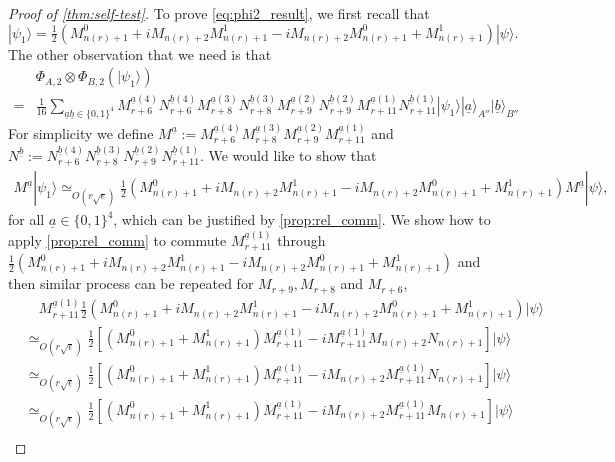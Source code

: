 \documentclass[11pt,letterpaper]{article}
\newcommand{\ket}[1]{|#1\rangle}
\newcommand{\x}{\otimes}
\newcommand{\1}{\mathbb{1}}
\newcommand{\nr}{n(r)}
\newcommand{\ua}{\underline{a}}
\newcommand{\ub}{\underline{b}}
\newcommand{\se}{\sqrt{\epsilon}}
\newcommand{\appd}[1]{\simeq_{#1}}
\theoremstyle{definition}
\begin{document}
\begin{proof}[Proof of \cref{thm:self-test}]
To prove \cref{eq:phi2_result}, we first
recall that 
$\ket{\psi_1} 
	=\frac{1}{2} (M_{\nr+1}^0 + iM_{\nr+2}M_{\nr+1}^1 - iM_{\nr+2}M_{\nr+1}^0 + M_{\nr+1}^1) \ket{\psi}.
$
The other observation that we need is that 
\begin{align}
	&\Phi_{A,2} \x \Phi_{B,2} (\ket{\psi_1})  \\
	= &\frac{1}{16} \sum_{\ua \ub \in\{0,1\}^4}
	M_{r+6}^{\ua(4)}N_{r+6}^{\ub(4)}M_{r+8}^{\ua(3)}N_{r+8}^{\ub(3)}M_{r+9}^{\ua(2)}N_{r+9}^{\ub(2)}M_{r+11}^{\ua(1)}N_{r+11}^{\ub(1)}
	\ket{\psi_1} \ket{\ua}_{A''} \ket{\ub}_{B''}
\end{align}
For simplicity we define $M^{\ua} := M_{r+6}^{\ua(4)}M_{r+8}^{\ua(3)}M_{r+9}^{\ua(2)}M_{r+11}^{\ua(1)}$ and
$N^{\ub} := N_{r+6}^{\ub(4)}N_{r+8}^{\ub(3)}N_{r+9}^{\ub(2)}N_{r+11}^{\ub(1)} $.
We would like to show that 
\begin{align}
\label{eq:mua_comm}
M^{\ua} \ket{\psi_1} \appd{O(r\se)} \frac{1}{2} (M_{\nr+1}^0 + iM_{\nr+2}M_{\nr+1}^1 - iM_{\nr+2}M_{\nr+1}^0 + M_{\nr+1}^1)
M^{\ua} \ket{\psi},
\end{align}
for all $\ua \in \{0,1\}^4$,
which can be justified by \cref{prop:rel_comm}.
We show how to apply \cref{prop:rel_comm} to commute $M_{r+11}^{\ua(1)}$ through 
$\frac{1}{2} (M_{\nr+1}^0 + iM_{\nr+2}M_{\nr+1}^1 - iM_{\nr+2}M_{\nr+1}^0 + M_{\nr+1}^1)$ and then similar process can be repeated for $M_{r+9}, M_{r+8}$ and $M_{r+6}$,
\begin{align*}
	&\quad M_{r+11}^{\ua(1)} \frac{1}{2} (M_{\nr+1}^0 + iM_{\nr+2}M_{\nr+1}^1 - iM_{\nr+2}M_{\nr+1}^0 + M_{\nr+1}^1) \ket{\psi} \\
	&\appd{O(r\se)} \frac{1}{2}[ (M_{\nr+1}^0+M_{\nr+1}^1) M_{r+11}^{\ua(1)} -i M_{r+11}^{\ua(1)} M_{\nr+2}N_{\nr+1}] \ket{\psi} \\
	&\appd{O(r\se)} \frac{1}{2} [(M_{\nr+1}^0+M_{\nr+1}^1) M_{r+11}^{\ua(1)} - iM_{\nr+2}M_{r+11}^{\ua(1)} N_{\nr+1}] \ket{\psi} \\
	&\appd{O(r\se)}\frac{1}{2} [(M_{\nr+1}^0+M_{\nr+1}^1) M_{r+11}^{\ua(1)} - iM_{\nr+2}M_{r+11}^{\ua(1)} M_{\nr+1}] \ket{\psi} \\

\end{align*}
\end{proof}
\end{document}
